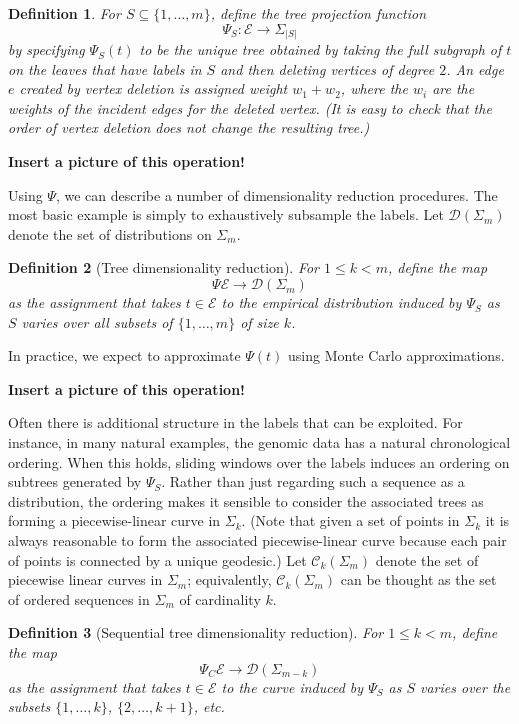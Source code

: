 \documentclass[a4paper,11pt]{article}
\newtheorem{definition}{Definition}
\newcommand{\aC}{\mathcal{C}}
\newcommand{\aD}{\mathcal{D}}
\newcommand{\aE}{\mathcal{E}}
\begin{document}
\begin{definition}
For $S \subseteq \{1,\ldots,m\}$, define the tree projection function 
\[
\Psi_S \colon \aE \to \Sigma_{|S|}
\] 
by specifying $\Psi_S(t)$ to be the unique tree obtained by taking the full subgraph of $t$ on the leaves that have labels in $S$ and then deleting vertices of degree $2$.  
An edge $e$ created by vertex deletion is assigned weight $w_1 + w_2$, where the $w_i$ are the weights of the incident edges for the deleted vertex.
(It is easy to check that the order of vertex deletion does not change the resulting tree.)
\end{definition}

{\bf Insert a picture of this operation!}

Using $\Psi$, we can describe a number of dimensionality reduction procedures.  
The most basic example is simply to exhaustively subsample the labels.
Let $\aD(\Sigma_m)$ denote the set of distributions on $\Sigma_m$.

\begin{definition}[Tree dimensionality reduction]
For $1 \leq k < m$, define the map
\[
\Psi \aE \to \aD(\Sigma_m)
\]
as the assignment that takes $t \in \aE$ to the empirical distribution induced by $\Psi_S$ as $S$ varies over all subsets of $\{1,\ldots,m\}$ of size $k$.
\end{definition}

In practice, we expect to approximate $\Psi(t)$ using Monte Carlo approximations.

{\bf Insert a picture of this operation!}

Often there is additional structure in the labels that can be exploited.
For instance, in many natural examples, the genomic data has a natural chronological ordering.
When this holds, sliding windows over the labels induces an ordering on subtrees generated by $\Psi_S$.
Rather than just regarding such a sequence as a distribution, the ordering makes it sensible to consider the associated trees as forming a piecewise-linear curve in $\Sigma_k$.
(Note that given a set of points in $\Sigma_k$ it is always reasonable to form the associated piecewise-linear curve because each pair of points is connected by a unique geodesic.)
Let $\aC_k(\Sigma_m)$ denote the set of piecewise linear curves in $\Sigma_m$; equivalently, $\aC_k(\Sigma_m)$ can be thought as the set of ordered sequences in $\Sigma_m$ of cardinality $k$.

\begin{definition}[Sequential tree dimensionality reduction]
For $1 \leq k < m$, define the map
\[
\Psi_C \aE \to \aD(\Sigma_{m-k})
\]
as the assignment that takes $t \in \aE$ to the curve induced by $\Psi_S$ as $S$ varies over the subsets $\{1, \ldots, k\}$, $\{2, \ldots, k+1\}$, etc.
\end{definition}
\end{document}
